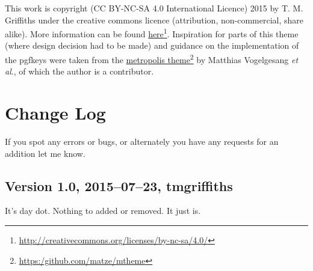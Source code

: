 \documentclass[a4paper,oneside,12pt]{article}
\begin{document}
This work is copyright (CC BY-NC-SA 4.0 International Licence) 2015 by T. M. Griffiths under the creative commons licence (attribution, non-commercial, share alike). More information can be found \href{http://creativecommons.org/licenses/by-nc-sa/4.0/}{here}\footnote{\url{http://creativecommons.org/licenses/by-nc-sa/4.0/}}. Inspiration for parts of this theme (where design decision had to be made) and guidance on the implementation of the pgfkeys were taken from the \href{https:/github.com/matze/mtheme}{metropolis theme}\footnote{\url{https:/github.com/matze/mtheme}} by Matthias Vogelgesang \textit{et al}., of which the author is a contributor. 

\vspace{1em}\begin{center}\ccbysa\end{center}


\section{Change Log}
If you spot any errors or bugs, or alternately you have any requests for an addition let me know.
\subsection*{Version 1.0, 2015–07–23, tmgriffiths}
It's day dot. Nothing to added or removed. It just is.
\end{document}
